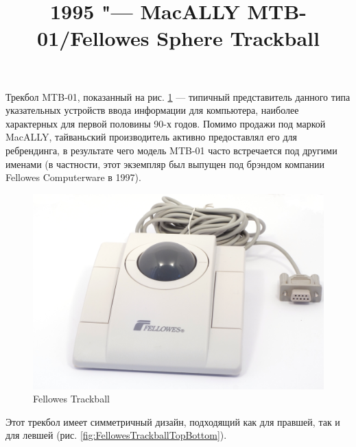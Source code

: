 \documentclass[11pt, a4paper]{article}
\begin{document}
\title{1995 "--- MacALLY MTB-01/Fellowes Sphere Trackball}
\date{}
\maketitle
{}
Трекбол MTB-01, показанный на рис. \ref{fig:FellowesTrackballPic} — типичный представитель данного типа указательных устройств ввода информации для компьютера, наиболее характерных для первой половины 90-х годов. Помимо продажи под маркой MacALLY, тайваньский производитель активно предоставлял его для ребрендинга, в результате чего модель MTB-01 часто встречается под другими именами (в частности, этот экземпляр был выпущен под брэндом компании Fellowes Computerware в 1997).

\begin{figure}[h]
    \centering
    \includegraphics[scale=0.5]{1995_fellowes_trackball/pic_30.jpg}
    \caption{Fellowes Trackball}
    \label{fig:FellowesTrackballPic}
\end{figure}

Этот трекбол имеет симметричный дизайн, подходящий как для правшей, так и для левшей (рис. \ref{fig:FellowesTrackballTopBottom}). 
\end{document}
